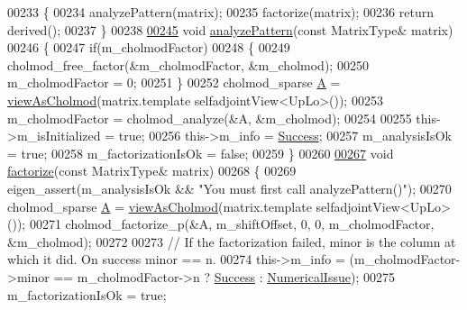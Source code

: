 \begin{DoxyCode}
00233     \{
00234       analyzePattern(matrix);
00235       factorize(matrix);
00236       \textcolor{keywordflow}{return} derived();
00237     \}
00238     
\hyperlink{class_eigen_1_1_cholmod_base_a5ac967e9f4ccfc43ca9e610b89232c24}{00245}     \textcolor{keywordtype}{void} \hyperlink{class_eigen_1_1_cholmod_base_a5ac967e9f4ccfc43ca9e610b89232c24}{analyzePattern}(\textcolor{keyword}{const} MatrixType& matrix)
00246     \{
00247       \textcolor{keywordflow}{if}(m\_cholmodFactor)
00248       \{
00249         cholmod\_free\_factor(&m\_cholmodFactor, &m\_cholmod);
00250         m\_cholmodFactor = 0;
00251       \}
00252       cholmod\_sparse \hyperlink{group___core___module_class_eigen_1_1_matrix}{A} = \hyperlink{namespace_eigen_ac9fb9e40cfc9ddbdc7da84ee01bb7545}{viewAsCholmod}(matrix.template selfadjointView<UpLo>());
00253       m\_cholmodFactor = cholmod\_analyze(&A, &m\_cholmod);
00254       
00255       this->m\_isInitialized = \textcolor{keyword}{true};
00256       this->m\_info = \hyperlink{group__enums_gga85fad7b87587764e5cf6b513a9e0ee5ea52581b035f4b59c203b8ff999ef5fcea}{Success};
00257       m\_analysisIsOk = \textcolor{keyword}{true};
00258       m\_factorizationIsOk = \textcolor{keyword}{false};
00259     \}
00260     
\hyperlink{class_eigen_1_1_cholmod_base_a5bd9c9ec4d1c15f202a6c66b5e9ef37b}{00267}     \textcolor{keywordtype}{void} \hyperlink{class_eigen_1_1_cholmod_base_a5bd9c9ec4d1c15f202a6c66b5e9ef37b}{factorize}(\textcolor{keyword}{const} MatrixType& matrix)
00268     \{
00269       eigen\_assert(m\_analysisIsOk && \textcolor{stringliteral}{"You must first call analyzePattern()"});
00270       cholmod\_sparse \hyperlink{group___core___module_class_eigen_1_1_matrix}{A} = \hyperlink{namespace_eigen_ac9fb9e40cfc9ddbdc7da84ee01bb7545}{viewAsCholmod}(matrix.template selfadjointView<UpLo>());
00271       cholmod\_factorize\_p(&A, m\_shiftOffset, 0, 0, m\_cholmodFactor, &m\_cholmod);
00272 
00273       \textcolor{comment}{// If the factorization failed, minor is the column at which it did. On success minor == n.}
00274       this->m\_info = (m\_cholmodFactor->minor == m\_cholmodFactor->n ? \hyperlink{group__enums_gga85fad7b87587764e5cf6b513a9e0ee5ea52581b035f4b59c203b8ff999ef5fcea}{Success} : 
      \hyperlink{group__enums_gga85fad7b87587764e5cf6b513a9e0ee5eaaf9b736d310a664e7729d163a035cc5f}{NumericalIssue});
00275       m\_factorizationIsOk = \textcolor{keyword}{true};

\end{DoxyCode}
